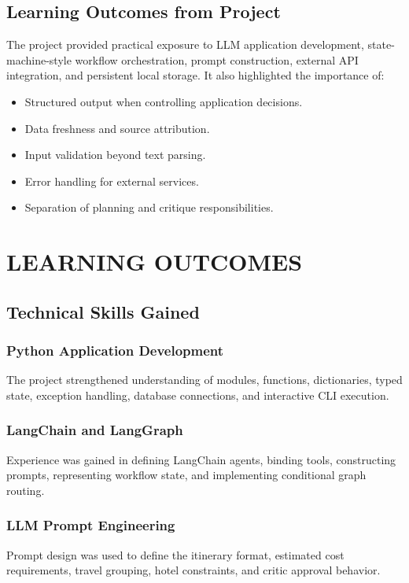 \documentclass[12pt,a4paper]{report}
\begin{document}
\section{Learning Outcomes from Project}
\label{sec:project-learning-outcomes}
The project provided practical exposure to LLM application development, state-machine-style
workflow orchestration, prompt construction, external API integration, and persistent local storage.
It also highlighted the importance of:
\begin{itemize}
    \item Structured output when controlling application decisions.
    \item Data freshness and source attribution.
    \item Input validation beyond text parsing.
    \item Error handling for external services.
    \item Separation of planning and critique responsibilities.
\end{itemize}


\chapter{LEARNING OUTCOMES}
\label{ch:learning-outcomes}

\section{Technical Skills Gained}
\label{sec:technical-skills-gained}

\subsection{Python Application Development}
\label{subsec:python-app-development}
The project strengthened understanding of modules, functions, dictionaries, typed state,
exception handling, database connections, and interactive CLI execution.

\subsection{LangChain and LangGraph}
\label{subsec:langchain-langgraph}
Experience was gained in defining LangChain agents, binding tools, constructing prompts,
representing workflow state, and implementing conditional graph routing.

\subsection{LLM Prompt Engineering}
\label{subsec:llm-prompt-engineering}
Prompt design was used to define the itinerary format, estimated cost requirements, travel
grouping, hotel constraints, and critic approval behavior.
\end{document}
